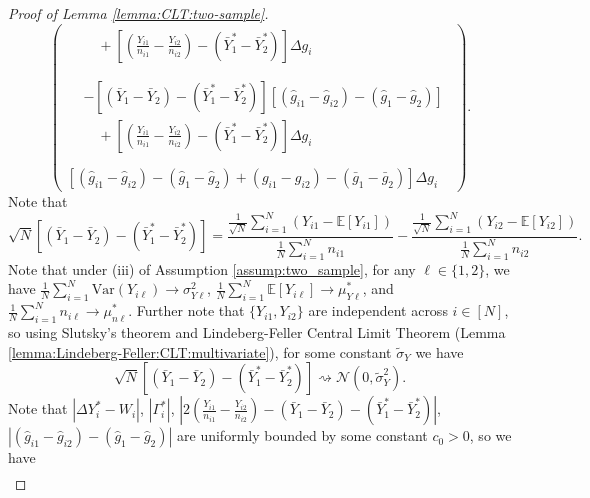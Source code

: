 \documentclass[12pt,letterpaper]{article}
\begin{document}
\begin{proof}[Proof of Lemma \ref{lemma:CLT:two-sample}]
\begin{equation}
\begin{pmatrix}
\begin{array}{rl}
        &\quad+\displaystyle\left[\left(\frac{Y_{i1}}{n_{i1}}-\frac{Y_{i2}}{n_{i2}}\right)-(\bar{Y}_1^*-\bar{Y}_2^*)\right]\Delta g_i
        \end{array}\\
        \\
        \begin{array}{rl}
        &\displaystyle-[(\bar{Y}_1-\bar{Y}_2)-(\bar{Y}_1^*-\bar{Y}_2^*)][(\hat{g}_{i1}-\hat{g}_{i2})-(\hat{g}_1-\hat{g}_2)]\\
        &\quad+\displaystyle\left[\left(\frac{Y_{i1}}{n_{i1}}-\frac{Y_{i2}}{n_{i2}}\right)-(\bar{Y}_1^*-\bar{Y}_2^*)\right]\Delta g_i
        \end{array}\\
        \\
        [(\hat{g}_{i1}-\hat{g}_{i2})-(\hat{g}_1-\hat{g}_2)+(g_{i1}-g_{i2})-(\bar{g}_1-\bar{g}_2)]\Delta g_i
    \end{pmatrix}.
\end{equation}
Note that 
\begin{equation}\label{eq:CLT:Y:diff}
\sqrt{N}\left[(\bar{Y}_1-\bar{Y}_2)-(\bar{Y}_1^*-\bar{Y}_2^*)\right]=\frac{\frac{1}{\sqrt{N}}\sum_{i=1}^N(Y_{i1}-\mathbb{E}[Y_{i1}])}{\frac{1}{N}\sum_{i=1}^Nn_{i1}}-\frac{\frac{1}{\sqrt{N}}\sum_{i=1}^N(Y_{i2}-\mathbb{E}[Y_{i2}])}{\frac{1}{N}\sum_{i=1}^Nn_{i2}}.
\end{equation}
Note that under (iii) of Assumption \ref{assump:two_sample}, for any $\ell\in\{1,2\}$, we have $\frac{1}{N}\sum_{i=1}^N\mathrm{Var}(Y_{i\ell})\rightarrow\sigma_{Y\ell}^2$,  
$\frac{1}{N}\sum_{i=1}^N\mathbb{E}[Y_{i\ell}]\rightarrow\mu_{Y\ell}^*$, and $\frac{1}{N}\sum_{i=1}^Nn_{i\ell}\rightarrow\mu_{n\ell}^*$. Further note that $\{Y_{i1}, Y_{i2}\}$ are independent across $i\in[N]$, so using Slutsky's theorem and Lindeberg-Feller Central Limit Theorem (Lemma \ref{lemma:Lindeberg-Feller:CLT:multivariate}), for some constant $\tilde{\sigma}_Y$ we have 
\begin{equation}\label{eq:CLT:Y:two-sample}
    \sqrt{N}\left[(\bar{Y}_1-\bar{Y}_2)-(\bar{Y}_1^*-\bar{Y}_2^*)\right]\rightsquigarrow\mathcal{N}\left(0,\tilde{\sigma}_Y^2\right).
\end{equation}
Note that $|\Delta Y_i^*-W_i|$, $|\Gamma_i^*|$, $\displaystyle\left|2\left(\frac{Y_{i1}}{n_{i1}}-\frac{Y_{i2}}{n_{i2}}\right)-(\bar{Y}_1-\bar{Y}_2)-(\bar{Y}_1^*-\bar{Y}_2^*)\right|$, $|(\hat{g}_{i1}-\hat{g}_{i2})-(\hat{g}_1-\hat{g}_2)|$ are uniformly bounded by some constant $c_0>0$, so we have 
$$\begin{array}{rl}

\end{array}$$
\end{proof}
\end{document}
